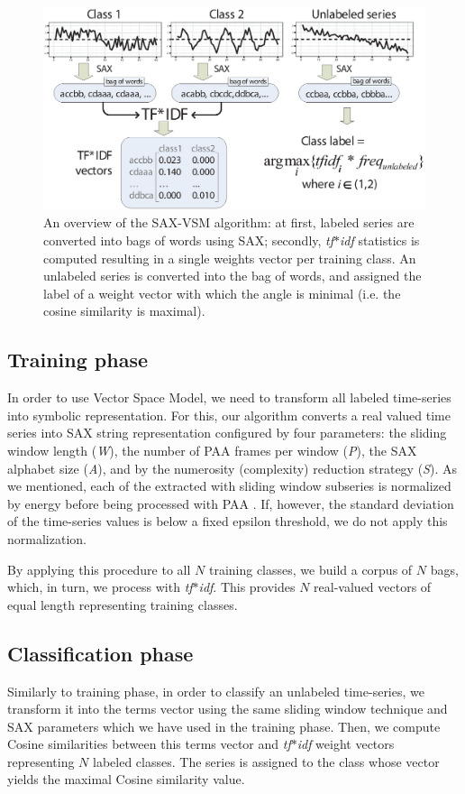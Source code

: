 \documentclass{llncs}
\newcommand{\myfigureshrinker}{\vspace{-1cm}}
\begin{document}
\begin{figure}[t]
   \centering
   \myfigureshrinker
   \includegraphics[width=115mm]{figures/overview.eps}
   \caption{
   An overview of the SAX-VSM algorithm: 
   at first, labeled series are converted into bags of words using SAX; 
   secondly, \textit{tf$\ast$idf} statistics is computed resulting in 
   a single weights vector per training class. An unlabeled series is converted 
   into the bag of words, and assigned the label of a weight vector with which 
   the angle is minimal (i.e. the cosine similarity is maximal).}
   \label{fig:overview}
\end{figure}

\subsection{Training phase}
In order to use Vector Space Model, we need to transform all labeled time-series into 
symbolic representation.  For this, our algorithm converts a real valued time series 
into SAX string representation configured by four parameters: the sliding window
length (\textit{W}), the number of PAA frames per window (\textit{P}), the SAX alphabet size
(\textit{A}), and by the numerosity (complexity) reduction strategy (\textit{S}). 
As we mentioned, each of the extracted with sliding window subseries is normalized 
by energy before being processed with PAA \cite{goldin_kanellakis}. If, however, 
the standard deviation of the time-series values is below a fixed epsilon threshold, 
we do not apply this normalization.

By applying this procedure to all $N$ training classes, we build a corpus of $N$ bags, 
which, in turn, we process with \textit{tf$\ast$idf}. This provides $N$ real-valued 
vectors of equal length representing training classes. 

\subsection{Classification phase}
Similarly to training phase, in order to classify an unlabeled time-series, we transform it into the
terms vector using the same sliding window technique and SAX parameters which we have used 
in the training phase. Then, we compute Cosine similarities between this terms vector and 
\textit{tf$\ast$idf} weight vectors representing $N$ labeled classes. 
The series is assigned to the class whose vector yields the maximal Cosine similarity value.
\end{document}
